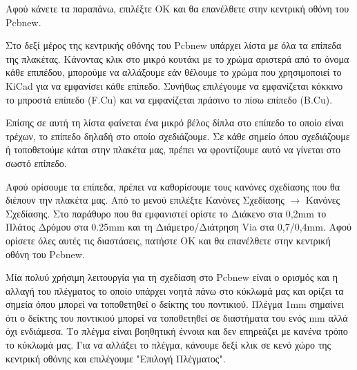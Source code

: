 \documentclass[a4paper]{article}
\begin{document}
Αφού κάνετε τα παραπάνω, επιλέξτε ΟΚ και θα επανέλθετε στην κεντρική οθόνη του \textenglish{Pcbnew}.

\begin{figure}
  \begin{center}
    \label{fig:kicad-main}
  \end{center}
\end{figure}

Στο δεξί μέρος της κεντρικής οθόνης του \textenglish{Pcbnew} υπάρχει λίστα με όλα τα επίπεδα της πλακέτας. Κάνοντας κλικ στο μικρό κουτάκι με το χρώμα αριστερά από το όνομα κάθε επιπέδου, μπορούμε να αλλάξουμε εάν θέλουμε το χρώμα που χρησιμοποιεί το \textenglish{KiCad} για να εμφανίσει κάθε επίπεδο. Συνήθως επιλέγουμε να εμφανίζεται κόκκινο το μπροστά επίπεδο (F.Cu) και να εμφανίζεται πράσινο το πίσω επίπεδο (B.Cu).

Επίσης σε αυτή τη λίστα φαίνεται ένα μικρό βέλος δίπλα στο επίπεδο το οποίο είναι τρέχων, το επίπεδο δηλαδή στο οποίο σχεδιάζουμε. Σε κάθε σημείο όπου σχεδιάζουμε ή τοποθετούμε κάται στην πλακέτα μας, πρέπει να φροντίζουμε αυτό να γίνεται στο σωστό επίπεδο.

Αφού ορίσουμε τα επίπεδα, πρέπει να καθορίσουμε τους κανόνες σχεδίασης που θα διέπουν την πλακέτα μας. Από το μενού επιλέξτε Κανόνες Σχεδίασης $\rightarrow$ Κανόνες Σχεδίασης. Στο παράθυρο που θα εμφανιστεί ορίστε το Διάκενο στα 0,2mm το Πλάτος Δρόμου στα 0.25mm και τη Διάμετρο/Διάτρηση Via στα 0,7/0,4mm. Αφού ορίσετε όλες αυτές τις διαστάσεις, πατήστε ΟΚ και θα επανέλθετε στην κεντρική οθόνη του \textenglish{Pcbnew}.

\begin{figure}
  \begin{center}
    \label{fig:kicad-main}
  \end{center}
\end{figure}


Μία πολυύ χρήσιμη λειτουργία για τη σχεδίαση στο \textenglish{Pcbnew} είναι ο ορισμός και η αλλαγή του πλέγματος το οποίο υπάρχει νοητά πάνω στο κύκλωμά μας και ορίζει τα σημεία όπου μπορεί να τοποθετηθεί ο δείκτης του ποντικιού. Πλέγμα 1mm σημαίνει ότι ο δείκτης του ποντικιού μπορεί να τοποθετηθεί σε διαστήματα του ενός mm αλλά όχι ενδιάμεσα. Το πλέγμα είναι βοηθητική έννοια και δεν επηρεάζει με κανένα τρόπο το κύκλωμά μας. Για να αλλάξει το πλέγμα, κάνουμε δεξί κλικ σε κενό χώρο της κεντρική οθόνης και επιλέγουμε "Επιλογή Πλέγματος".
\end{document}

